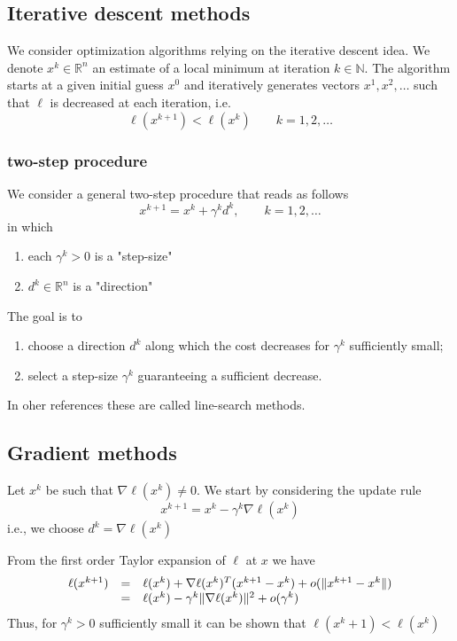\documentclass{book}
\newcommand{\R}{\mathbb{R}}
\newcommand{\N}{\mathbb{N}}
\theoremstyle{definition}
\theoremstyle{remark}
\theoremstyle{remark}
\begin{document}
\subsection{Iterative descent methods}
We consider optimization algorithms relying on the iterative descent idea. We denote $x^k\in\R^n$ an estimate of a local minimum at iteration $k\in\N$. The algorithm starts at a given initial guess $x^0$ and iteratively generates vectors $x^1,x^2,\dots$ such that $\ell$ is decreased at each iteration, i.e. 
\[
    \ell(x^{k+1})<\ell(x^k) \qquad k = 1,2,\dots
\]
\subsubsection{two-step procedure}
We consider a general two-step procedure that reads as follows 
\[
    x^{k+1} = x^k+\gamma^k d^k, \qquad k=1,2,\dots
\]
in which 
\begin{enumerate}
    \item each $\gamma^k>0$ is a "step-size" 
    \item $d^k\in\R^n$ is a "direction"
\end{enumerate}
The goal is to 
\begin{enumerate}
    \item choose a direction $d^k$ along which the cost decreases for $\gamma^k$ sufficiently small;
    \item select a step-size $\gamma^k$ guaranteeing a sufficient decrease. 
\end{enumerate}
In oher references these are called line-search methods.
\subsection{Gradient methods}
Let $x^k$ be such that $\nabla\ell(x^k)\neq 0$. We start by considering the update rule 
\[
    x^{k+1} = x^k-\gamma^k\nabla\ell(x^k)
\]
i.e., we choose $d^k = \nabla\ell(x^k)$

From the first order Taylor expansion of $\ell$ at $x$ we have 
\begin{gather*}
    \begin{array}{r c l}
        \ell(x^{k+1}) & = & \ell(x^k)+\nabla\ell(x^k)^T(x^{k+1}-x^k)+o(\|x^{k+1}-x^k\|)\\
                      & = & \ell(x^k)-\gamma^k\|\nabla\ell(x^k)\|^2+o(\gamma^k)
    \end{array}
\end{gather*}
Thus, for $\gamma^k>0$ sufficiently small it can be shown that $\ell(x^k+1)<\ell(x^k)$
\end{document}
